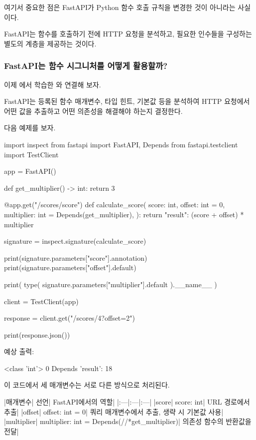 여기서 중요한 점은 FastAPI가 Python 함수 호출 규칙을 변경한 것이 아니라는 사실이다.

FastAPI는 함수를 호출하기 전에 HTTP 요청을 분석하고, 필요한 인수들을 구성하는 별도의 계층을 제공하는 것이다.

\subsubsection{FastAPI는 함수 시그니처를 어떻게 활용할까?}

이제 에서 학습한 와 연결해 보자.

FastAPI는 등록된 함수 매개변수, 타입 힌트, 기본값 등을 분석하여 HTTP 요청에서 어떤 값을 추출하고 어떤 의존성을 해결해야 하는지 결정한다.

다음 예제를 보자.

\begin{dhkcode}
import inspect
from fastapi import FastAPI, Depends
from fastapi.testclient import TestClient

app = FastAPI()

def get_multiplier() -> int:
    return 3

@app.get("/scores/{score}")
def calculate_score(
    score: int,
    offset: int = 0,
    multiplier: int = Depends(get_multiplier),
):
    return {
        "result": (score + offset) * multiplier
    }

signature = inspect.signature(calculate_score)

print(signature.parameters["score"].annotation)
print(signature.parameters["offset"].default)

print(
    type(
        signature.parameters["multiplier"].default
    ).__name__
)

client = TestClient(app)

response = client.get("/scores/4?offset=2")

print(response.json())
\end{dhkcode}

예상 출력:

\begin{dhkzsh}
<class 'int'>
0
Depends
{'result': 18}
\end{dhkzsh}

이 코드에서 세 매개변수는 서로 다른 방식으로 처리된다.

\begin{dhktable}
|매개변수|	선언|	FastAPI에서의 역할|
|:---|:---|:---|
|score|	score: int|	URL 경로에서 추출|
|offset|	offset: int = 0|	쿼리 매개변수에서 추출, 생략 시 기본값 사용|
|multiplier|	multiplier: int = Depends(//*get_multiplier)|	의존성 함수의 반환값을 전달|
\end{dhktable}

